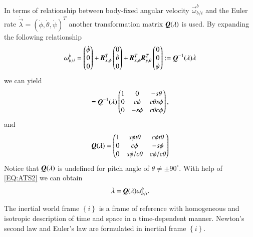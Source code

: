 In terms of relationship between body-fixed angular velocity $\vec{\omega}_{b/i}^{b}$ and the Euler rate $\dot{\vec{\lambda}}=(\dot{\phi}, \dot{\theta}, \dot{\psi})^{T}$ another transformation matrix $\emph{\textbf{Q}}(\vec{\lambda})$ is used. 
By expanding the following relationship
\begin{align}
\vec{\omega}_{b/i}^{b}=
\begin{pmatrix}
\dot{\phi}\\0\\0
\end{pmatrix}+
\emph{\textbf{R}}^{T}_{x,\phi}
\begin{pmatrix}
0\\ \dot{\theta}\\0
\end{pmatrix}+
\emph{\textbf{R}}^{T}_{x,\phi}\emph{\textbf{R}}^{T}_{y,\theta}
\begin{pmatrix}
0\\0\\ \dot{\psi}
\end{pmatrix}
:=\emph{\textbf{Q}}^{-1}(\vec{\lambda})\dot{\vec{\lambda}}
\end{align}
we can yield
\begin{align}
=\emph{\textbf{Q}}^{-1}(\vec{\lambda})
\begin{pmatrix}
1&0&-s\theta \\
0&c \phi&c \theta s \phi \\
0&-s \phi&c \theta c\phi
\end{pmatrix},\label{EQ:ATS1}
\end{align}
and
\begin{align}
\emph{\textbf{Q}}(\vec{\lambda})=
\begin{pmatrix}
1&s \phi t \theta&c \phi t\theta \\
0&c \phi&-s \phi \\
0&s \phi/c \theta&c \phi/ c\theta
\end{pmatrix}\label{EQ:ATS2}
\end{align}
Notice that $\emph{\textbf{Q}}(\vec{\lambda})$ is undefined for pitch angle of $\theta \neq \pm 90^{\circ}$. With help of \ref{EQ:ATS2} we can obtain
\begin{align}
\dot{\vec{\lambda}}=\emph{\textbf{Q}}(\vec{\lambda})\vec{\omega}^{b}_{b/i}.
\end{align}

The inertial world frame $\left\{ i \right\}$ is a frame of reference with homogeneous and isotropic description of time and space in a time-dependent manner. Newton's second law and Euler's law are formulated in inertial frame $\left\{ i \right\}$.


